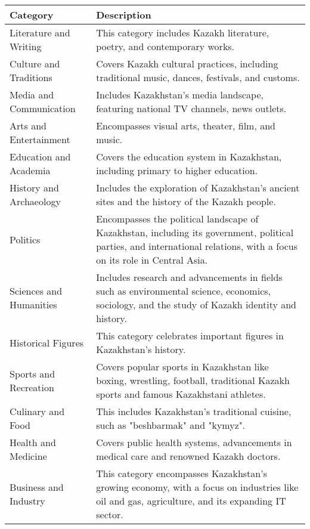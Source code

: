 \begin{table*}
\scriptsize
\begin{tabular}{p{} p{}}
    \toprule
    \textbf{Category} & \textbf{Description} \\ 
    \midrule
    Literature and Writing & This category includes Kazakh literature, poetry, and contemporary works. \\ \midrule
    Culture and Traditions & Covers Kazakh cultural practices, including traditional music, dances, festivals, and customs. \\ \midrule
    Media and Communication & Includes Kazakhstan’s media landscape, featuring national TV channels, news outlets. \\ \midrule
    Arts and Entertainment & Encompasses visual arts, theater, film, and music. \\ \midrule
    Education and Academia & Covers the education system in Kazakhstan, including primary to higher education. \\ \midrule
    History and Archaeology & Includes the exploration of Kazakhstan’s ancient sites and the history of the Kazakh people. \\ \midrule
    Politics & Encompasses the political landscape of Kazakhstan, including its government, political parties, and international relations, with a focus on its role in Central Asia. \\ \midrule
    Sciences and Humanities & Includes research and advancements in fields such as environmental science, economics, sociology, and the study of Kazakh identity and history. \\ \midrule
    Historical Figures & This category celebrates important figures in Kazakhstan’s history. \\ \midrule
    Sports and Recreation & Covers popular sports in Kazakhstan like boxing, wrestling, football, traditional Kazakh sports and famous Kazakhstani athletes. \\ \midrule
    Culinary and Food & This includes Kazakhstan's traditional cuisine, such as "beshbarmak" and "kymyz". \\ \midrule
    Health and Medicine & Covers public health systems, advancements in medical care and renowned Kazakh doctors. \\ \midrule
    Business and Industry & This category encompasses Kazakhstan’s growing economy, with a focus on industries like oil and gas, agriculture, and its expanding IT sector. \\ \midrule

\end{tabular}
\end{table*}
